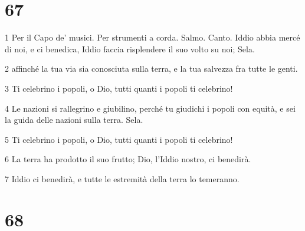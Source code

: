 \chapter{67}

\par 1 Per il Capo de' musici. Per strumenti a corda. Salmo. Canto. Iddio abbia mercé di noi, e ci benedica, Iddio faccia risplendere il suo volto su noi; Sela.
\par 2 affinché la tua via sia conosciuta sulla terra, e la tua salvezza fra tutte le genti.
\par 3 Ti celebrino i popoli, o Dio, tutti quanti i popoli ti celebrino!
\par 4 Le nazioni si rallegrino e giubilino, perché tu giudichi i popoli con equità, e sei la guida delle nazioni sulla terra. Sela.
\par 5 Ti celebrino i popoli, o Dio, tutti quanti i popoli ti celebrino!
\par 6 La terra ha prodotto il suo frutto; Dio, l'Iddio nostro, ci benedirà.
\par 7 Iddio ci benedirà, e tutte le estremità della terra lo temeranno.

\chapter{68}

